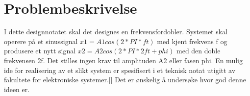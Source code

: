 \section{Problembeskrivelse}
\label{problemBeskrivelse}


I dette designnotatet skal det designes en frekvensfordobler. Systemet skal operere på et sinussignal $x1 = A1 cos(2*PI*f t)$
med kjent frekvens f og produsere et nytt signal $x2 = A2 cos(2*PI*2f t+phi)$ med den doble frekvensen
2f. Det stilles ingen krav til amplituden A2 eller fasen phi.
En mulig ide for realisering av et slikt system er spesifisert i et teknisk notat utigitt av fakultete for elektroniske systemer.[] Det er ønskelig å undersøke
hvor god denne ideen er.